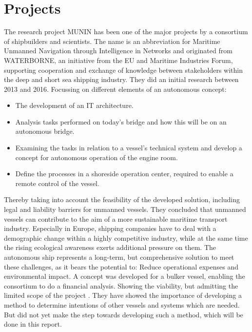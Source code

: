 \section{Projects}
The research project MUNIN has been one of the major projects by a consortium of shipbuilders and scientists. The name is an abbreviation for Maritime Unmanned Navigation through Intelligence in Networks and originated from WATERBORNE, an initiative from the EU and Maritime Industries Forum, supporting cooperation and exchange of knowledge between stakeholders within the deep and short sea shipping industry. They did an initial research between 2013 and 2016. Focussing on different elements of an autonomous concept: 
\begin{itemize}
	\item The development of an IT architecture. 
	\item Analysis tasks performed on today's bridge and how this will be on an autonomous bridge. 
	\item Examining the tasks in relation to a vessel’s technical system and develop a concept for autonomous operation of the engine room. 
	\item Define the processes in a shoreside operation center, required to enable a remote control of the vessel. 
\end{itemize}
Thereby taking into account the feasibility of the developed solution, including legal and liability barriers for unmanned vessels.
They concluded that unmanned vessels can contribute to the aim of a more sustainable maritime transport industry. Especially in Europe, shipping companies have to deal with a demographic change within a highly competitive industry, while at the same time the rising ecological awareness exerts additional pressure on them. The autonomous ship represents a long-term, but comprehensive solution to meet these challenges, as it bears the potential to: Reduce operational expenses and environmental impact.
A concept was developed for a bulker vessel, enabling the consortium to do a financial analysis. Showing the viability, but admitting the limited scope of the project \cite{MUNIN2016}. They have showed the importance of developing a method to determine intentions of other vessels and systems which are needed. But did not yet make the step towards developing such a method, which will be done in this report.

